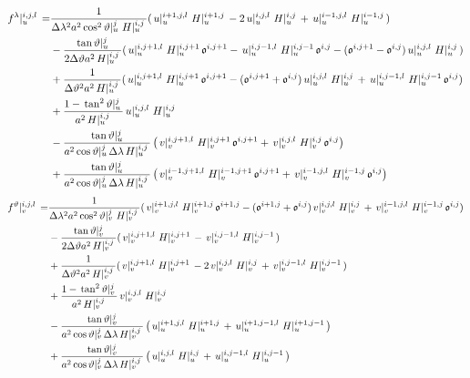 \documentclass[a4paper]{article}
\begin{document}
\begin{equation}
  \begin{split}
    \,{f^\lambda}\vert_{u}^{{i},{j},{l}}\, =&
    \frac1{\Delta\lambda^2 a^2\,{\cos^2\vartheta}\vert_{u}^{{j}}\,\,{H}\vert_{u}^{{i},{j}}\,}(\,{u}\vert_{u}^{{i+1},{j},{l}}\,\,{H}\vert_{u}^{{i+1},{j}}\,-2\,{u}\vert_{u}^{{i},{j},{l}}\,\,{H}\vert_{u}^{{i},{j}}\,+\,{u}\vert_{u}^{{i-1},{j},{l}}\,\,{H}\vert_{u}^{{i-1},{j}}\,)\\
    &-\frac{\,{\tan\vartheta}\vert_{u}^{{j}}\,}{2\Delta\vartheta a^2\,{H}\vert_{u}^{{i},{j}}\,}(\,{u}\vert_{u}^{{i},{j+1},{l}}\,\,{H}\vert_{u}^{{i},{j+1}}\,\mathfrak{o}^{i,j+1}-\,{u}\vert_{u}^{{i},{j-1},{l}}\,\,{H}\vert_{u}^{{i},{j-1}}\,\mathfrak{o}^{i,j}-(\mathfrak{o}^{i,j+1}-\mathfrak{o}^{i,j})\,{u}\vert_{u}^{{i},{j},{l}}\,\,{H}\vert_{u}^{{i},{j}}\,)\\
    &+\frac1{\Delta\vartheta^2 a^2\,{H}\vert_{u}^{{i},{j}}\,}(\,{u}\vert_{u}^{{i},{j+1},{l}}\,\,{H}\vert_{u}^{{i},{j+1}}\,\mathfrak{o}^{i,j+1}-(\mathfrak{o}^{i,j+1}+\mathfrak{o}^{i,j})\,{u}\vert_{u}^{{i},{j},{l}}\,\,{H}\vert_{u}^{{i},{j}}\,+\,{u}\vert_{u}^{{i},{j-1},{l}}\,\,{H}\vert_{u}^{{i},{j-1}}\,\mathfrak{o}^{i,j})\\
    &+\frac{1-\,{\tan^2\vartheta}\vert_{u}^{{j}}\,}{a^2\,{H}\vert_{u}^{{i},{j}}\,}\,{u}\vert_{u}^{{i},{j},{l}}\,\,{H}\vert_{u}^{{i},{j}}\,\\
    &-\frac{\,{\tan\vartheta}\vert_{u}^{{j}}\,}{a^2\,{\cos\vartheta}\vert_{u}^{{j}}\,\Delta\lambda\,{H}\vert_{u}^{{i},{j}}\,}\left(\,{v}\vert_{v}^{{i},{j+1},{l}}\,\,{H}\vert_{v}^{{i},{j+1}}\,\mathfrak{o}^{i,j+1}+\,{v}\vert_{v}^{{i},{j},{l}}\,\,{H}\vert_{v}^{{i},{j}}\,\mathfrak{o}^{i,j}\right)\\
    &+\frac{\,{\tan\vartheta}\vert_{u}^{{j}}\,}{a^2\,{\cos\vartheta}\vert_{u}^{{j}}\,\Delta\lambda\,{H}\vert_{u}^{{i},{j}}\,}\left(\,{v}\vert_{v}^{{i-1},{j+1},{l}}\,\,{H}\vert_{v}^{{i-1},{j+1}}\,\mathfrak{o}^{i,j+1}+\,{v}\vert_{v}^{{i-1},{j},{l}}\,\,{H}\vert_{v}^{{i-1},{j}}\,\mathfrak{o}^{i,j}\right)
  \end{split}
\end{equation}
\begin{equation}
  \begin{split}
    \,{f^\vartheta}\vert_{v}^{{i},{j},{l}}\, =&
    \frac1{\Delta\lambda^2 a^2\,{\cos^2\vartheta}\vert_{v}^{{j}}\,\,{H}\vert_{v}^{{i},{j}}\,}(\,{v}\vert_{v}^{{i+1},{j},{l}}\,\,{H}\vert_{v}^{{i+1},{j}}\,\mathfrak{o}^{i+1,j}-(\mathfrak{o}^{i+1,j}+\mathfrak{o}^{i,j})\,{v}\vert_{v}^{{i},{j},{l}}\,\,{H}\vert_{v}^{{i},{j}}\,+\,{v}\vert_{v}^{{i-1},{j},{l}}\,\,{H}\vert_{v}^{{i-1},{j}}\,\mathfrak{o}^{i,j})\\
    &-\frac{\,{\tan\vartheta}\vert_{v}^{{j}}\,}{2\Delta\vartheta a^2\,{H}\vert_{v}^{{i},{j}}\,}(\,{v}\vert_{v}^{{i},{j+1},{l}}\,\,{H}\vert_{v}^{{i},{j+1}}\,-\,{v}\vert_{v}^{{i},{j-1},{l}}\,\,{H}\vert_{v}^{{i},{j-1}}\,)\\
    &+\frac1{\Delta\vartheta^2 a^2\,{H}\vert_{v}^{{i},{j}}\,}(\,{v}\vert_{v}^{{i},{j+1},{l}}\,\,{H}\vert_{v}^{{i},{j+1}}\,-2\,{v}\vert_{v}^{{i},{j},{l}}\,\,{H}\vert_{v}^{{i},{j}}\,+\,{v}\vert_{v}^{{i},{j-1},{l}}\,\,{H}\vert_{v}^{{i},{j-1}}\,)\\
    &+\frac{1-\,{\tan^2\vartheta}\vert_{v}^{{j}}\,}{a^2\,{H}\vert_{v}^{{i},{j}}\,}\,{v}\vert_{v}^{{i},{j},{l}}\,\,{H}\vert_{v}^{{i},{j}}\,\\
    &-\frac{\,{\tan\vartheta}\vert_{v}^{{j}}\,}{a^2\,{\cos\vartheta}\vert_{v}^{{j}}\,\Delta\lambda\,{H}\vert_{v}^{{i},{j}}\,}\left(\,{u}\vert_{u}^{{i+1},{j},{l}}\,\,{H}\vert_{u}^{{i+1},{j}}\,+\,{u}\vert_{u}^{{i+1},{j-1},{l}}\,\,{H}\vert_{u}^{{i+1},{j-1}}\,\right)\\
    &+\frac{\,{\tan\vartheta}\vert_{v}^{{j}}\,}{a^2\,{\cos\vartheta}\vert_{v}^{{j}}\,\Delta\lambda\,{H}\vert_{v}^{{i},{j}}\,}\left(\,{u}\vert_{u}^{{i},{j},{l}}\,\,{H}\vert_{u}^{{i},{j}}\,+\,{u}\vert_{u}^{{i},{j-1},{l}}\,\,{H}\vert_{u}^{{i},{j-1}}\,\right)
  \end{split}
\end{equation}
\end{document}
